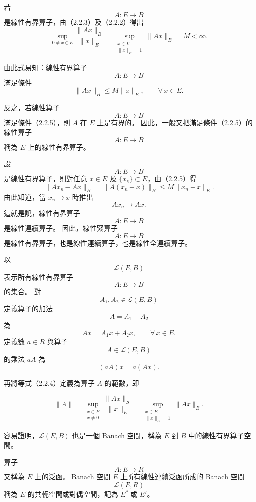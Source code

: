 \documentclass[11pt,a4paper,twoside]{article}
\newcommand{\pnum}[1]{%
    \makebox[0pt][r]{%
        \scriptsize\textbf{[#1]}\hspace{0.7em}%
    }%
}
\begin{document}
\noindent
\pnum{77}
若
\[
    A:E\longrightarrow B
\]
是線性有界算子，由（2.2.3）及（2.2.2）得出
\begin{equation}
    \sup_{0\neq x\in E}
    \frac{\|Ax\|_B}{\|x\|_E}
    =
    \sup_{\substack{x\in E\\ \|x\|_E=1}}
    \|Ax\|_B
    =
    M
    <
    \infty.
    \tag{2.2.4}
\end{equation}

由此式易知：線性有界算子
\[
    A:E\longrightarrow B
\]
滿足條件
\begin{equation}
    \|Ax\|_B
    \le
    M\|x\|_E,
    \qquad
    \forall\,x\in E.
    \tag{2.2.5}
\end{equation}

反之，若線性算子
\[
    A:E\longrightarrow B
\]
滿足條件（2.2.5），則 $A$ 在 $E$ 上是有界的。
因此，一般又把滿足條件（2.2.5）的線性算子
\[
    A:E\longrightarrow B
\]
稱為 $E$ 上的線性有界算子。

\noindent
\pnum{78}
設
\[
    A:E\longrightarrow B
\]
是線性有界算子，則對任意 $x\in E$ 及
$\{x_n\}\subset E$，由（2.2.5）得
\[
    \|Ax_n-Ax\|_B
    =
    \|A(x_n-x)\|_B
    \le
    M\|x_n-x\|_E.
\]
由此知道，當 $x_n\to x$ 時推出
\[
    Ax_n\to Ax.
\]
這就是說，線性有界算子
\[
    A:E\longrightarrow B
\]
是線性連續算子。
因此，線性緊算子
\[
    A:E\longrightarrow B
\]
是線性有界算子，也是線性連續算子，也是線性全連續算子。

\noindent
\pnum{79}
以
\[
    \mathcal{L}(E,B)
\]
表示所有線性有界算子
\[
    A:E\longrightarrow B
\]
的集合。
對
\[
    A_1,A_2\in\mathcal{L}(E,B)
\]
定義算子的加法
\[
    A=A_1+A_2
\]
為
\[
    Ax=A_1x+A_2x,
    \qquad
    \forall\,x\in E.
\]
定義數 $a\in R$ 與算子
\[
    A\in\mathcal{L}(E,B)
\]
的乘法 $aA$ 為
\[
    (aA)x
    =
    a(Ax).
\]

再將等式（2.2.4）定義為算子 $A$ 的範數，即

\newpage

\noindent
\pnum{80}
\[
    \|A\|
    =
    \sup_{\substack{x\in E\\x\neq 0}}
    \frac{\|Ax\|_B}{\|x\|_E}
    =
    \sup_{\substack{x\in E\\ \|x\|_E=1}}
    \|Ax\|_B.
\]

容易證明，$\mathcal{L}(E,B)$ 也是一個 Banach 空間，稱為 $E$ 到 $B$ 中的線性有界算子空間。

\noindent
\pnum{81}
算子
\[
    A:E\longrightarrow R
\]
又稱為 $E$ 上的泛函。
Banach 空間 $E$ 上所有線性連續泛函所成的 Banach 空間
\[
    \mathcal{L}(E,R)
\]
稱為 $E$ 的共軛空間或對偶空間，記為 $E^*$ 或 $E'$。
\end{document}
